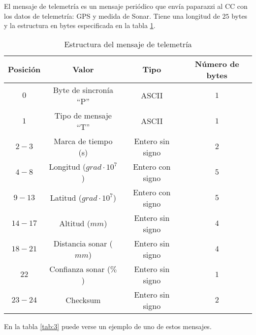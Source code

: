 El mensaje de telemetría es un mensaje periódico que envía paparazzi al CC con los datos de telemetría: GPS y medida de Sonar. Tiene una longitud de $25$ bytes y la estructura en bytes especificada en la tabla \ref{tab:2}.

\begin{table}[h]
	\centering
	\caption{Estructura del mensaje de telemetría}
	\begin{tabular}{|c|c|c|c|}\hline 
		\textbf{Posición}	& \textbf{Valor} & \textbf{Tipo} &\textbf{Número de bytes} \\ \hline \hline 
		$0$		& Byte de sincronía ``P''				& ASCII	 			&	$1$ \\  \hline
		$1$		& Tipo de mensaje ``T''				& ASCII	 			&	$1$ \\  \hline
		$2-3$	& Marca de tiempo (s)				& Entero sin signo	&   $2$ \\  \hline
		$4-8$	& Longitud ($grad \cdot 10^{7}$)	& Entero con signo	&   $5$ \\  \hline
		$9-13$	& Latitud ($grad \cdot 10^{7}$)		& Entero con signo	&  	$5$ \\  \hline
		$14-17$	& Altitud ($mm$)					& Entero sin signo	&   $4$ \\  \hline
		$18-21$	& Distancia sonar ($mm$)			& Entero sin signo	&   $4$ \\  \hline
		$22$	& Confianza sonar ($\%$)			& Entero sin signo	&   $1$ \\  \hline
		$23-24$	& Checksum 							& Entero sin signo	&   $2$ \\  \hline
	\end{tabular}
	\label{tab:2}
\end{table}

En la tabla \ref{tab:3} puede verse un ejemplo de uno de estos mensajes.

